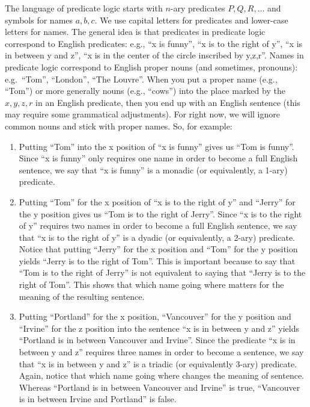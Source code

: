 \documentclass[
]{book}
\providecommand{\tightlist}{%
  \setlength{\itemsep}{0pt}\setlength{\parskip}{0pt}}
\begin{document}
The language of predicate logic starts with \(n\)-ary predicates \(P,Q,R,\ldots\) and symbols for names \(a,b,c\). We use capital letters for predicates and lower-case letters for names. The general idea is that predicates in predicate logic correspond to English predicates: e.g., ``x is funny'', ``x is to the right of y'', ``x is in between y and z'', ``x is in the center of the circle inscribed by y,z,r''. Names in predicate logic correspond to English proper nouns (and sometimes, pronouns): e.g.~``Tom'', ``London'', ``The Louvre''. When you put a proper name (e.g., ``Tom'') or more generally nouns (e.g., ``cows'') into the place marked by the \(x,y,z,r\) in an English predicate, then you end up with an English sentence (this may require some grammatical adjustments). For right now, we will ignore common nouns and stick with proper names. So, for example:

\begin{enumerate}
\def\labelenumi{\arabic{enumi}.}
\tightlist
\item
  Putting ``Tom'' into the x position of ``x is funny'' gives us ``Tom is funny''. Since ``x is funny'' only requires one name in order to become a full English sentence, we say that ``x is funny'' is a monadic (or equivalently, a 1-ary) predicate.
\item
  Putting ``Tom'' for the x position of ``x is to the right of y'' and ``Jerry'' for the y position gives us ``Tom is to the right of Jerry''. Since ``x is to the right of y'' requires two names in order to become a full English sentence, we say that ``x is to the right of y'' is a dyadic (or equivalently, a 2-ary) predicate. Notice that putting ``Jerry'' for the x position and ``Tom'' for the y position yields ``Jerry is to the right of Tom''. This is important because to say that ``Tom is to the right of Jerry'' is not equivalent to saying that ``Jerry is to the right of Tom''. This shows that which name going where matters for the meaning of the resulting sentence.
\item
  Putting ``Portland'' for the x position, ``Vancouver'' for the y position and ``Irvine'' for the z position into the sentence ``x is in between y and z'' yields ``Portland is in between Vancouver and Irvine''. Since the predicate ``x is in between y and z'' requires three names in order to become a sentence, we say that ``x is in between y and z'' is a triadic (or equivalently 3-ary) predicate. Again, notice that which name going where changes the meaning of sentence. Whereas ``Portland is in between Vancouver and Irvine'' is true, ``Vancouver is in between Irvine and Portland'' is false.
\end{enumerate}
\end{document}
